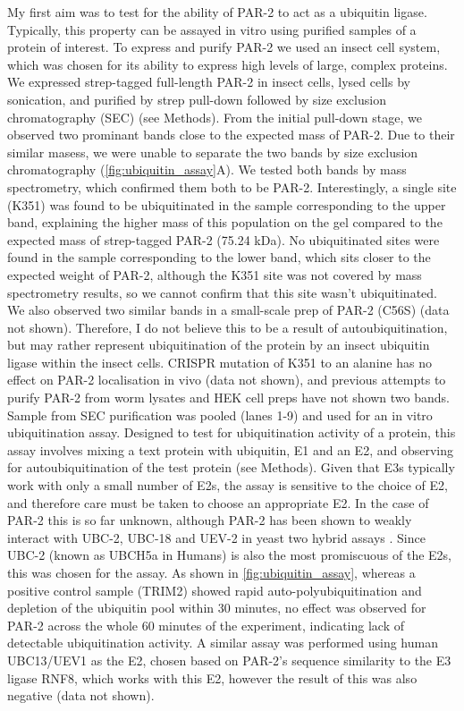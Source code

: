 \documentclass[12pt]{"report"}
\begin{document}
My first aim was to test for the ability of PAR-2 to act as a ubiquitin ligase. Typically, this property can be assayed in vitro using purified samples of a protein of interest. To express and purify PAR-2 we used an insect cell system, which was chosen for its ability to express high levels of large, complex proteins. We expressed strep-tagged full-length PAR-2 in insect cells, lysed cells by sonication, and purified by strep pull-down followed by size exclusion chromatography (SEC) (see Methods). From the initial pull-down stage, we observed two prominant bands close to the expected mass of PAR-2. Due to their similar masess, we were unable to separate the two bands by size exclusion chromatography (\cref{fig:ubiquitin_assay}A). We tested both bands by mass spectrometry, which confirmed them both to be PAR-2. Interestingly, a single site (K351) was found to be ubiquitinated in the sample corresponding to the upper band, explaining the higher mass of this population on the gel compared to the expected mass of strep-tagged PAR-2 (75.24 kDa). No ubiquitinated sites were found in the sample corresponding to the lower band, which sits closer to the expected weight of PAR-2, although the K351 site was not covered by mass spectrometry results, so we cannot confirm that this site wasn't ubiquitinated. We also observed two similar bands in a small-scale prep of PAR-2 (C56S) (data not shown). Therefore, I do not believe this to be a result of autoubiquitination, but may rather represent ubiquitination of the protein by an insect ubiquitin ligase within the insect cells. CRISPR mutation of K351 to an alanine has no effect on PAR-2 localisation in vivo (data not shown), and previous attempts to purify PAR-2 from worm lysates and HEK cell preps have not shown two bands.\\

Sample from SEC purification was pooled (lanes 1-9) and used for an in vitro ubiquitination assay. Designed to test for ubiquitination activity of a protein, this assay involves mixing a text protein with ubiquitin, E1 and an E2, and observing for autoubiquitination of the test protein (see Methods). Given that E3s typically work with only a small number of E2s, the assay is sensitive to the choice of E2, and therefore care must be taken to choose an appropriate E2. In the case of PAR-2 this is so far unknown, although PAR-2 has been shown to weakly interact with UBC-2, UBC-18 and UEV-2 in yeast two hybrid assays \citep{Gudgen2004}. Since UBC-2 (known as UBCH5a in Humans) is also the most promiscuous of the E2s, this was chosen for the assay. As shown in \cref{fig:ubiquitin_assay}, whereas a positive control sample (TRIM2) showed rapid auto-polyubiquitination and depletion of the ubiquitin pool within 30 minutes, no effect was observed for PAR-2 across the whole 60 minutes of the experiment, indicating lack of detectable ubiquitination activity. A similar assay was performed using human UBC13/UEV1 as the E2, chosen based on PAR-2's sequence similarity to the E3 ligase RNF8, which works with this E2, however the result of this was also negative (data not shown).\\
\end{document}
